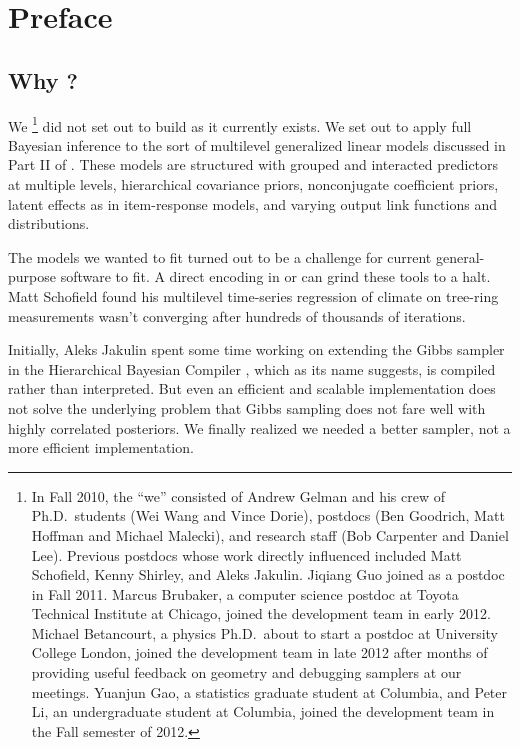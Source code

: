 \chapter*{Preface}

\section*{Why \Stan?}

We%
%
\footnote{In Fall 2010, the ``we'' consisted of Andrew Gelman and his
  crew of Ph.D.\ students (Wei Wang and Vince Dorie), postdocs (Ben
  Goodrich, Matt Hoffman and Michael Malecki), and research staff (Bob
  Carpenter and Daniel Lee).  Previous postdocs whose work directly
  influenced \Stan included Matt Schofield, Kenny Shirley, and Aleks
  Jakulin.  Jiqiang Guo joined as a postdoc in Fall 2011.  Marcus
  Brubaker, a computer science postdoc at Toyota Technical Institute
  at Chicago, joined the development team in early 2012.  Michael
  Betancourt, a physics Ph.D.\ about to start a postdoc at University
  College London, joined the development team in late 2012 after
  months of providing useful feedback on geometry and debugging
  samplers at our meetings. Yuanjun Gao, a statistics graduate student at
  Columbia, and Peter Li, an undergraduate student at Columbia,
  joined the development team in the Fall semester of 2012.}
%
did not set out to build \Stan as it currently exists.  We set out to
apply full Bayesian inference to the sort of multilevel generalized
linear models discussed in Part II of \citep{GelmanHill:2007}.  These
models are structured with grouped and interacted predictors at
multiple levels, hierarchical covariance priors, nonconjugate
coefficient priors, latent effects as in item-response models, and
varying output link functions and distributions.

The models we wanted to fit turned out to be a challenge for current
general-purpose software to fit.  A direct encoding in \BUGS or \JAGS
can grind these tools to a halt.  Matt Schofield found his multilevel
time-series regression of climate on tree-ring measurements wasn't
converging after hundreds of thousands of iterations.

Initially, Aleks Jakulin spent some time working on extending the
Gibbs sampler in the Hierarchical Bayesian Compiler
\citep{DaumeIII:2007}, which as its name suggests, is compiled rather
than interpreted.  But even an efficient and scalable implementation
does not solve the underlying problem that Gibbs sampling does not
fare well with highly correlated posteriors.  We finally realized we
needed a better sampler, not a more efficient implementation.

